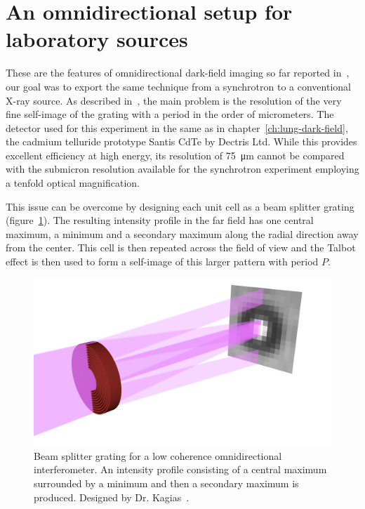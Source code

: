 \section{An omnidirectional setup for laboratory sources}
These are the features of omnidirectional dark-field imaging so far reported
in~\parencite{PhysRevLett.116.093902}, our goal was to export the same
technique from a synchrotron to a conventional X-ray source.
As described in~\parencite{kagias2018omnidir}, the main problem is the
resolution of
the very fine self-image of the grating with a period in the order of 
micrometers. The detector used for this experiment in the same as in
chapter~\ref{ch:lung-dark-field}, the cadmium telluride prototype Santis
CdTe by Dectris Ltd. While this provides excellent efficiency at high
energy, its resolution of \SI{75}{\micro\meter} cannot be compared with the
submicron resolution available for the synchrotron experiment employing a tenfold optical magnification.

This issue can be overcome by designing each unit cell as a beam splitter
grating (figure~\ref{fig:beam-splitter}). The resulting intensity profile in the far
field has one central maximum, a minimum and a secondary maximum along the
radial direction away from the center. This cell
is then repeated across the field of view and the Talbot effect is then used
to form a self-image of this larger pattern with period $P$.

\begin{figure}[htb]
    \centering
    \includegraphics[width=\textwidth]{gfx/omnidirectional/unit_cell.png}
    \caption{Beam splitter grating for a low coherence omnidirectional
    interferometer. An intensity profile consisting of a central maximum
surrounded by a minimum and then a secondary maximum is produced. Designed
by Dr. Kagias~\parencite{kagias2018omnidir}.}
    \label{fig:beam-splitter}
\end{figure}

